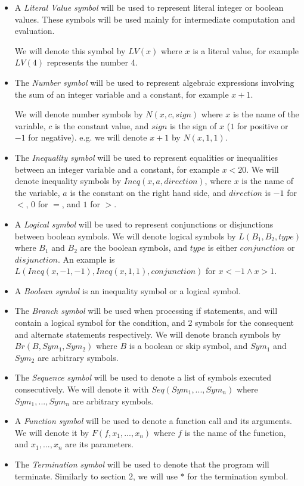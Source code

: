 \begin{itemize}
\item A {\it Literal Value symbol} will be used to represent literal integer or boolean values. These symbols will be used mainly for intermediate computation and evaluation.

We will denote this symbol by $LV(x)$ where $x$ is a literal value, for example $LV(4)$ represents the number 4.

\item The {\it Number symbol} will be used to represent algebraic expressions involving the sum of an integer variable and a constant, for example $x+1$.

  We will denote number symbols by $N(x,c,sign)$ where $x$ is the name of the variable, $c$ is the constant value, and $sign$ is the sign of $x$ ($1$ for positive or $-1$ for negative).
  e.g. we will denote $x+1$ by $N(x,1,1)$.

\item The {\it Inequality symbol} will be used to represent equalities or inequalities between an integer variable and a constant, for example $x<20$.
  We will denote inequality symbols by $Ineq(x,a,direction)$, where $x$ is the name of the variable, $a$ is the constant on the right hand side, and $direction$ is $-1$ for $<$, $0$ for $=$, and $1$ for $>$.

\item A {\it Logical symbol} will be used to represent conjunctions or disjunctions between boolean symbols.
  We will denote logical symbols by $L(B_1,B_2,type)$ where $B_1$ and $B_2$ are the boolean symbols, and $type$ is either $conjunction$ or $disjunction$.
  An example is $L(Ineq(x,-1,-1),Ineq(x,1,1),conjunction)$ for $x<-1 \land x>1$.

\item A {\it Boolean symbol} is an inequality symbol or a logical symbol.

\item The {\it Branch symbol} will be used when processing if statements, and will contain a logical symbol for the condition, and 2 symbols for the consequent and alternate statements respectively.
  We will denote branch symbols by $Br(B,Sym_1,Sym_2)$ where $B$ is a boolean or skip symbol, and $Sym_1$ and $Sym_2$ are arbitrary symbols.

\item The {\it Sequence symbol} will be used to denote a list of symbols executed consecutively.
  We will denote it with $Seq(Sym_1,...,Sym_n)$ where $Sym_1,...,Sym_n$ are arbitrary symbols.

\item A {\it Function symbol} will be used to denote a function call and its arguments.
  We will denote it by $F(f,x_1,...,x_n)$ where $f$ is the name of the function, and $x_1,...,x_n$ are its parameters.

\item The {\it Termination symbol} will be used to denote that the program will terminate.
  Similarly to section 2, we will use $*$ for the termination symbol.
\end{itemize}

